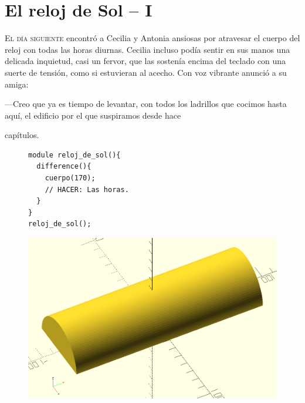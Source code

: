 \chapter{El reloj de Sol -- I}
\label{sec:el-reloj-de-sol-i}

\lettrine[lines=2]{E}{l día siguiente} encontró a Cecilia y Antonia
ansiosas por atravesar el cuerpo del reloj con todas las horas
diurnas. Cecilia incluso podía sentir en sus manos una delicada
inquietud, casi un fervor, que las sostenía encima del teclado con una
suerte de tensión, como si estuvieran al acecho. Con voz vibrante
anunció a su amiga:

---Creo que ya es tiempo de levantar, con todos los ladrillos que
cocimos hasta aquí, el edificio por el que suspiramos desde
hace\setcounter{m}{\thechapter}\addtocounter{m}{-1} \them{} capítulos.




\begin{figure}[ht]
  \begin{minipage}[]{.55\textwidth}%
    \begin{lstlisting}
module reloj_de_sol(){
  difference(){
    cuerpo(170);
    // HACER: Las horas.
  }
}
reloj_de_sol();
    \end{lstlisting}%
  \end{minipage}\hfill
   \begin{minipage}[]{.45\textwidth}%
     \centering
     \includegraphics[width=.9\textwidth]{imagenes/cuerpo-del-reloj-a}
\end{minipage}
\label{fig:cuerpo-del-reloj-a}
\end{figure}

